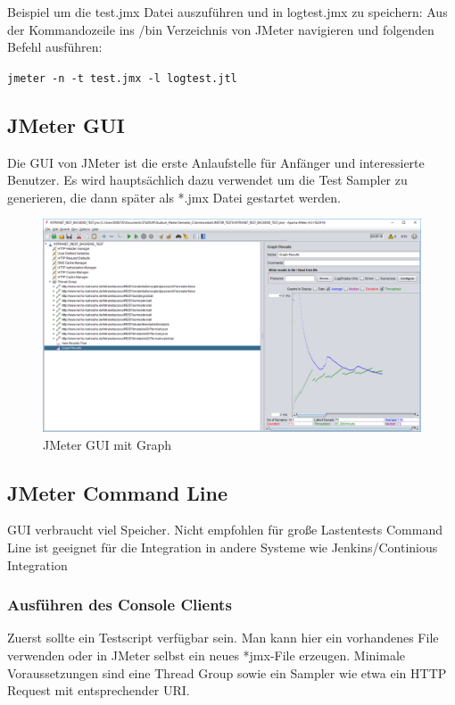 \documentclass[a4paper,12pt]{article}
\newcommand{\codeInLine}[1]{%
\colorbox{graybackgroundColor}{\lstinline{#1}} %
}
\begin{document}
Beispiel um die test.jmx Datei auszuführen und in logtest.jmx zu speichern: Aus der Kommandozeile ins /bin Verzeichnis von JMeter navigieren und folgenden Befehl ausführen: 

\codeInLine{jmeter -n -t test.jmx -l logtest.jtl} 


\subsection{JMeter GUI}
Die GUI von JMeter ist die erste Anlaufstelle für Anfänger und interessierte Benutzer. Es wird hauptsächlich dazu verwendet um die Test Sampler zu generieren, die dann später als *.jmx Datei gestartet werden.

\begin{figure}[htb]%
 \centering
    \includegraphics[width=1\textwidth]{bilder/jmeter_2.png}
  \caption{JMeter GUI mit Graph}
  \label{fig:gui_graph}
\end{figure}


\subsection{JMeter Command Line}
\label{chap:jmeter_commandline}
GUI verbraucht viel Speicher. Nicht empfohlen für große Lastentests
Command Line ist geeignet für die Integration in andere Systeme wie Jenkins/Continious Integration
\subsubsection{Ausführen des Console Clients}
Zuerst sollte ein Testscript verfügbar sein. Man kann hier ein vorhandenes File verwenden oder in JMeter selbst ein neues *jmx-File erzeugen. Minimale Voraussetzungen sind eine Thread Group sowie ein Sampler wie etwa ein HTTP Request mit entsprechender URI.
\end{document}
